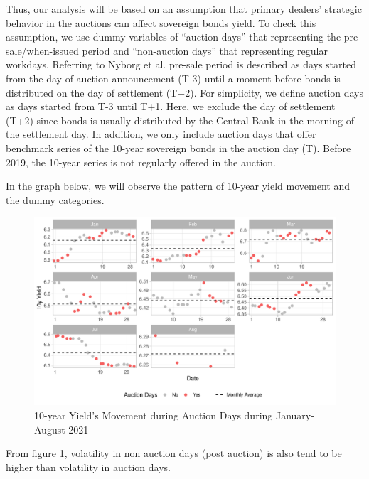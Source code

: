 \documentclass[11pt,a4paper,]{article}
\begin{document}
Thus, our analysis will be based on an assumption that primary dealers' strategic behavior in the auctions can affect sovereign bonds yield. To check this assumption, we use dummy variables of ``auction days'' that representing the pre-sale/when-issued period and ``non-auction days'' that representing regular workdays. Referring to Nyborg et al. \autocite*{Nyborg2004} pre-sale period is described as days started from the day of auction announcement (T-3) until a moment before bonds is distributed on the day of settlement (T+2). For simplicity, we define auction days as days started from T-3 until T+1. Here, we exclude the day of settlement (T+2) since bonds is usually distributed by the Central Bank in the morning of the settlement day. In addition, we only include auction days that offer benchmark series of the 10-year sovereign bonds in the auction day (T). Before 2019, the 10-year series is not regularly offered in the auction.

In the graph below, we will observe the pattern of 10-year yield movement and the dummy categories.

\begin{figure}
\centering
\includegraphics{Untitled_files/figure-latex/yieldmove-1.pdf}
\caption[\label{fig:yieldmove}10-year Yield's Movement during Auction Days during January-August 2021]{\label{fig:yieldmove}10-year Yield's Movement during Auction Days during January-August 2021\footnotemark{}}
\end{figure}

From figure \ref{fig:yieldmove}, volatility in non auction days (post auction) is also tend to be higher than volatility in auction days.
\end{document}
